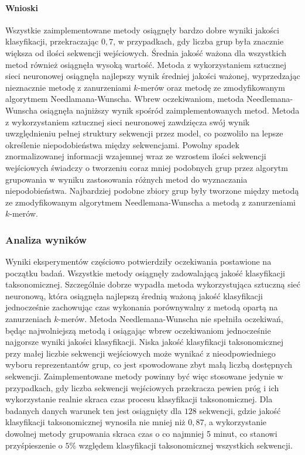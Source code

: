 \documentclass{article}
\begin{document}
{            \paragraph{Wnioski}
                Wszystkie zaimplementowane metody osiągnęły bardzo dobre wyniki jakości klasyfikacji, przekraczając $0,7$, w przypadkach, gdy liczba grup była znacznie większa od ilości sekwencji wejściowych. Średnia jakość ważona dla wszystkich metod również osiągnęła wysoką wartość.
                Metoda z wykorzystaniem sztucznej sieci neuronowej osiągnęła najlepszy wynik średniej jakości ważonej, wyprzedzając nieznacznie metodę z zanurzeniami $k$-merów oraz metodę ze zmodyfikowanym algorytmem Needlamana-Wunscha. Wbrew oczekiwaniom, metoda Needlemana-Wunscha osiągnęła najniższy wynik spośród zaimplementowanych metod.
                Metoda z wykorzystaniem sztucznej sieci neuronowej zawdzięcza swój wynik uwzględnieniu pełnej struktury sekwencji przez model, co pozwoliło na lepsze określenie niepodobieństwa między sekwencjami.
                Powolny spadek znormalizowanej informacji wzajemnej wraz ze wzrostem ilości sekwencji wejściowych świadczy o tworzeniu coraz mniej podobnych grup przez algorytm grupowania w wyniku zastosowania różnych metod do wyznaczania niepodobieństwa. Najbardziej podobne zbiory grup były tworzone między metodą ze zmodyfikowanym algorytmem Needlemana-Wunscha a metodą z zanurzeniami $k$-merów.

        \subsubsection{Analiza wyników}

            Wyniki eksperymentów częściowo potwierdziły oczekiwania postawione na początku badań. Wszystkie metody osiągnęły zadowalającą jakość klasyfikacji taksonomicznej. Szczególnie dobrze wypadła metoda wykorzystująca sztuczną sieć neuronową, która osiągnęła najlepszą średnią ważoną jakość klasyfikacji jednocześnie zachowując czas wykonania porównywalny z metodą opartą na zanurzeniach $k$-merów. Metoda Needlemana-Wunscha nie spełniła oczekiwań, będąc najwolniejszą metodą i osiągając wbrew oczekiwaniom jednocześnie najgorsze wyniki jakości klasyfikacji. Niska jakość klasyfikacji taksonomicznej przy małej liczbie sekwencji wejściowych może wynikać z nieodpowiedniego wyboru reprezentantów grup, co jest spowodowane zbyt małą liczbą dostępnych sekwencji. Zaimplementowane metody powinny być więc stosowane jedynie w przypadkach, gdy liczba sekwencji wejściowych przekracza pewien próg i ich wykorzystanie realnie skraca czas procesu klasyfikacji taksonomicznej. Dla badanych danych warunek ten jest osiągnięty dla $128$ sekwencji, gdzie jakość klasyfikacji taksonomicznej wynosiła nie mniej niż $0,87$, a wykorzystanie dowolnej metody grupowania skraca czas o co najmniej 5 minut, co stanowi przyśpieszenie o $5\%$ względem klasyfikacji taksonomicznej wszystkich sekwencji.
            }
\end{document}
